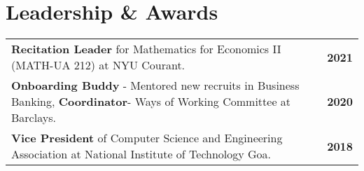 \documentclass[a4,10pt]{article}
\newcommand{\hskills}[1]{
\textbf{\bfseries #1} }
\begin{document}
\section{Leadership \& Awards}
\vspace{-0.2cm}
\begin{tabular}[t]{ p{52 em} p{4em}}

\textbf{Recitation Leader} for Mathematics for Economics II (MATH-UA 212) at NYU Courant. & \hskills{2021}
\\
\textbf{Onboarding Buddy }- Mentored new recruits in Business Banking,  \textbf{Coordinator}-  Ways of Working Committee at Barclays. & \hskills{2020} 
\\
\textbf{Vice President} of Computer Science and Engineering Association at National Institute of Technology Goa. & \hskills{2018} 
\\ 

\end{tabular} 

\end{document}
